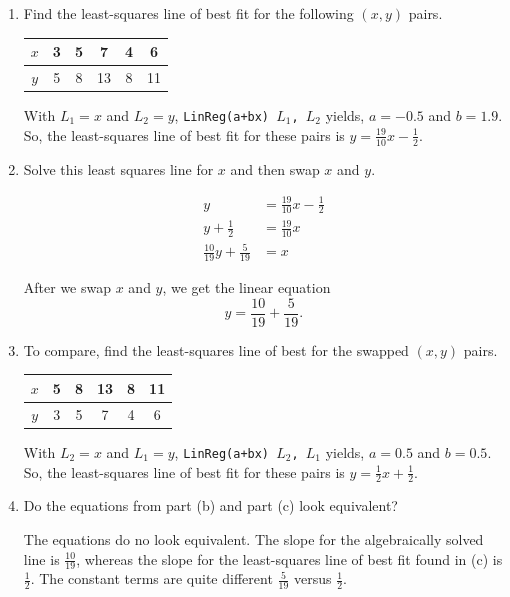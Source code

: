 \documentclass{article}
\begin{document}
\begin{enumerate}
	\begin{enumerate}
	\item Find the least-squares line of best fit for the following $(x, y)$ pairs.
	
	\begin{center}
	\begin{tabular}{c||ccccc}
	$x$ & 3 & 5 & 7 & 4 & 6 \\
	\hline
	$y$ & 5 & 8 & 13 & 8 & 11 \\
	\end{tabular} 
	\end{center}
	
	{\answer With $L_1 = x$ and $L_2= y$, \texttt{LinReg(a+bx) $L_1$, $L_2$} yields, $a = -0.5$ and $b = 1.9$.  So, the least-squares line of best fit for these pairs is $y = \frac{19}{10}x - \frac{1}{2}$. } 
	
	\vfill
	
	\item Solve this least squares line for $x$ and then swap $x$ and $y$.
	{\answer 
	\begin{align*} y &= \frac{19}{10}x - \frac{1}{2} \\ 
	y + \frac{1}{2} & = \frac{19}{10}x \\ 
	\frac{10}{19}y + \frac{5}{19} & = x
	\end{align*}
	
	After we swap $x$ and $y$, we get the linear equation $$y = \frac{10}{19} + \frac{5}{19}.$$
	}
	
	\vfill
	
	\item To compare, find the least-squares line of best for the swapped $(x, y)$ pairs.
	
	\begin{center}
	\begin{tabular}{c||ccccc}
	$x$ & 5 & 8 & 13 & 8 & 11 \\
	\hline
	$y$ & 3 & 5 & 7 & 4 & 6 
	\end{tabular} 
	\end{center}
	
	{\answer With $L_2 = x$ and $L_1= y$, \texttt{LinReg(a+bx) $L_2$, $L_1$} yields, $a = 0.5$ and $b = 0.5$.  So, the least-squares line of best fit for these pairs is $y = \frac{1}{2}x + \frac{1}{2}$. } 
    
    \vfill
    
	\item Do the equations from part (b) and part (c) look equivalent? 
	
	{\answer The equations do no look equivalent.  The slope for the algebraically solved line is $\frac{10}{19}$, whereas the slope for the least-squares line of best fit found in (c) is $\frac{1}{2}$.  The constant terms are quite different $\frac{5}{19}$ versus $\frac{1}{2}$.} 
	
	\vfill
	\end{enumerate}
	
\end{enumerate}
\end{document}
